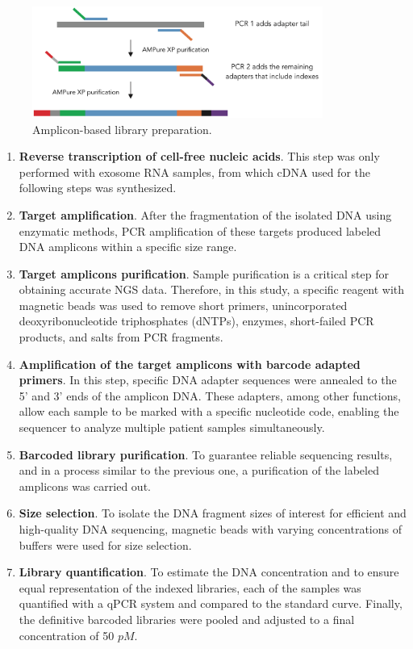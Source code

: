 \begin{figure}[ht]
    \centering
    \includegraphics[width=0.85\textwidth]{Images/chapter_3/NGS_library.png}
    \caption{Amplicon-based library preparation.}
    \label{fig:library}
\end{figure}

\begin{enumerate}[font=\bfseries]
    \item \textbf{Reverse transcription of cell-free nucleic acids}. This step was only performed with exosome RNA samples, from which cDNA used for the following steps was synthesized.
    \item \textbf{Target amplification}. After the fragmentation of the isolated DNA using enzymatic methods, PCR amplification of these targets produced labeled DNA amplicons within a specific size range.
    \item \textbf{Target amplicons purification}. Sample purification is a critical step for obtaining accurate NGS data. Therefore, in this study, a specific reagent with magnetic beads was used to remove short primers, unincorporated deoxyribonucleotide triphosphates (dNTPs), enzymes, short-failed PCR products, and salts from PCR fragments.
    \item \textbf{Amplification of the target amplicons with barcode adapted primers}. In this step, specific DNA adapter sequences were annealed to the 5' and 3' ends of the amplicon DNA. These adapters, among other functions, allow each sample to be marked with a specific nucleotide code, enabling the sequencer to analyze multiple patient samples simultaneously.
    \item \textbf{Barcoded library purification}. To guarantee reliable sequencing results, and in a process similar to the previous one, a purification of the labeled amplicons was carried out.
    \item \textbf{Size selection}. To isolate the DNA fragment sizes of interest for efficient and high-quality DNA sequencing, magnetic beads with varying concentrations of buffers were used for size selection.
    \item \textbf{Library quantification}. To estimate the DNA concentration and to ensure equal representation of the indexed libraries, each of the samples was quantified with a qPCR system and compared to the standard curve. Finally, the definitive barcoded libraries were pooled and adjusted to a final concentration of 50 $pM$.
\end{enumerate}


